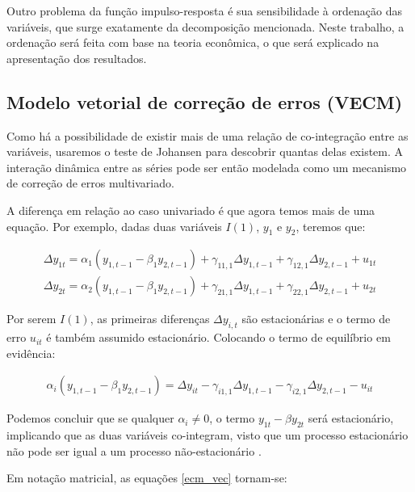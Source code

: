 \documentclass[a4paper,
               article,
               12pt,
               openany,
               oneside,
               english,
               brazil]{abntex2}
\numberwithin{equation}{section}
\begin{document}
   Outro problema da função impulso-resposta é sua sensibilidade à ordenação das variáveis, que surge exatamente da decomposição mencionada. Neste trabalho, a ordenação será feita com base na teoria econômica, o que será explicado na apresentação dos resultados.

    \subsection{Modelo vetorial de correção de erros (VECM)}

    Como há a possibilidade de existir mais de uma relação de co-integração entre as variáveis, usaremos o teste de Johansen para descobrir quantas delas existem. A interação dinâmica entre as séries pode ser então modelada como um mecanismo de correção de erros multivariado.

    A diferença em relação ao caso univariado é que agora temos mais de uma equação. Por exemplo, dadas duas variáveis $ I(1) $, $ y_1 $ e $ y_2 $, teremos que:

    \begin{equation}
        \begin{aligned}
            \label{ecm_vec}
            \Delta y_{1t} = \alpha_1 (y_{1,t-1} - \beta_1 y_{2, t-1}) + \gamma_{11,1} \Delta y_{1,t-1} + \gamma_{12,1} \Delta y_{2,t-1} + u_{1t} \\
            \Delta y_{2t} = \alpha_2 (y_{1,t-1} - \beta_1 y_{2, t-1}) + \gamma_{21,1} \Delta y_{1,t-1} + \gamma_{22,1} \Delta y_{2,t-1} + u_{2t}
        \end{aligned}
    \end{equation}

    Por serem $ I(1) $, as primeiras diferenças $ \Delta y_{i,t} $ são estacionárias e o termo de erro $ u_{it} $ é também assumido estacionário. Colocando o termo de equilíbrio em evidência:

    \begin{align*}
        \alpha_i (y_{1,t-1} - \beta_1 y_{2, t-1}) = \Delta y_{it} - \gamma_{i1,1} \Delta y_{1,t-1} - \gamma_{i2,1} \Delta y_{2,t-1} - u_{it}
    \end{align*}

    Podemos concluir que se qualquer $ \alpha_{i} \neq 0 $, o termo $ y_{1t} - \beta y_{2t} $ será estacionário, implicando que as duas variáveis co-integram, visto que um processo estacionário não pode ser igual a um processo não-estacionário \cite[p.~244-247]{lutkepool}.

    Em notação matricial, as equações \eqref{ecm_vec} tornam-se:
\end{document}
